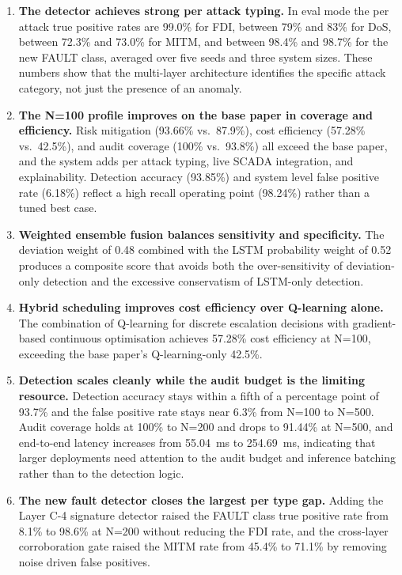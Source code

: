 \begin{enumerate}
    \item \textbf{The detector achieves strong per attack typing.} In eval mode the per attack true positive rates are 99.0\% for FDI, between 79\% and 83\% for DoS, between 72.3\% and 73.0\% for MITM, and between 98.4\% and 98.7\% for the new FAULT class, averaged over five seeds and three system sizes. These numbers show that the multi-layer architecture identifies the specific attack category, not just the presence of an anomaly.

    \item \textbf{The N=100 profile improves on the base paper in coverage and efficiency.} Risk mitigation (93.66\% vs.\ 87.9\%), cost efficiency (57.28\% vs.\ 42.5\%), and audit coverage (100\% vs.\ 93.8\%) all exceed the base paper, and the system adds per attack typing, live SCADA integration, and explainability. Detection accuracy (93.85\%) and system level false positive rate (6.18\%) reflect a high recall operating point (98.24\%) rather than a tuned best case.

    \item \textbf{Weighted ensemble fusion balances sensitivity and specificity.} The deviation weight of 0.48 combined with the LSTM probability weight of 0.52 produces a composite score that avoids both the over-sensitivity of deviation-only detection and the excessive conservatism of LSTM-only detection.

    \item \textbf{Hybrid scheduling improves cost efficiency over Q-learning alone.} The combination of Q-learning for discrete escalation decisions with gradient-based continuous optimisation achieves 57.28\% cost efficiency at N=100, exceeding the base paper's Q-learning-only 42.5\%.

    \item \textbf{Detection scales cleanly while the audit budget is the limiting resource.} Detection accuracy stays within a fifth of a percentage point of 93.7\% and the false positive rate stays near 6.3\% from N=100 to N=500. Audit coverage holds at 100\% to N=200 and drops to 91.44\% at N=500, and end-to-end latency increases from 55.04~ms to 254.69~ms, indicating that larger deployments need attention to the audit budget and inference batching rather than to the detection logic.

    \item \textbf{The new fault detector closes the largest per type gap.} Adding the Layer C-4 signature detector raised the FAULT class true positive rate from 8.1\% to 98.6\% at N=200 without reducing the FDI rate, and the cross-layer corroboration gate raised the MITM rate from 45.4\% to 71.1\% by removing noise driven false positives.


\end{enumerate}
